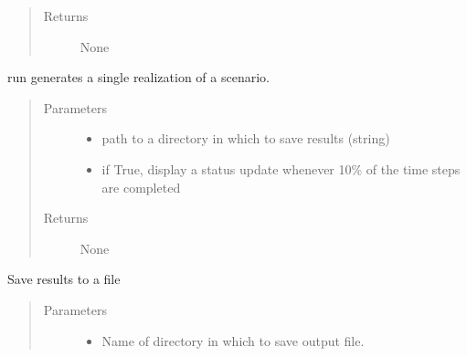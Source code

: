 \documentclass[letterpaper,10pt,english]{sphinxmanual}
\begin{document}
\begin{fulllineitems}
\begin{fulllineitems}
\begin{quote}
\begin{description}
\item[{Returns}] \leavevmode
None

\end{description}\end{quote}

\end{fulllineitems}


\begin{fulllineitems}
\label{\detokenize{index:feast.EmissionSimModules.simulation_classes.Scenario.run}}
run generates a single realization of a scenario.
\begin{quote}\begin{description}
\item[{Parameters}] \leavevmode\begin{itemize}
\item {} 
 \textendash{} path to a directory in which to save results (string)

\item {} 
 \textendash{} if True, display a status update whenever 10\% of the time steps are completed

\end{itemize}

\item[{Returns}] \leavevmode
None

\end{description}\end{quote}

\end{fulllineitems}


\begin{fulllineitems}
\label{\detokenize{index:feast.EmissionSimModules.simulation_classes.Scenario.save}}
Save results to a file
\begin{quote}\begin{description}
\item[{Parameters}] \leavevmode\begin{itemize}
\item {} 
 \textendash{} Name of directory in which to save output file.


\end{itemize}
\end{description}
\end{quote}
\end{fulllineitems}
\end{fulllineitems}
\end{document}
